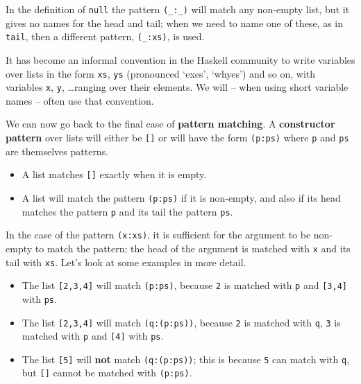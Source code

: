 In the definition
of \texttt{null} the pattern \verb+(_:_)+ will match any non-empty list,
but it gives no names for the head and tail; when we need to name one of
these, as in \texttt{tail}, then a different pattern,
\verb+(_:xs)+,
is used.

It has become an informal convention in the Haskell community to write
variables over lists in the form \texttt{xs}, \texttt{ys}  (pronounced `exes', `whyes')
and so on,
with variables \texttt{x}, \texttt{y}, \ldots ranging over their
elements. We will -- when using short variable names -- often use that convention.

We can now go back to the final case of \textbf{pattern matching}. A \textbf{constructor
pattern} over lists will either be \texttt{[]} or will have the form \texttt{(p:ps)}
where \texttt{p} 
and \texttt{ps} are themselves patterns. 
\begin{itemize}
\item
A list matches \texttt{[]} exactly when it is empty.
\item
A list will match the pattern \texttt{(p:ps)}
if it is non-empty, and also if its head matches the pattern
\texttt{p} and its tail the pattern \texttt{ps}. 
\end{itemize}
In the case of the
pattern \texttt{(x:xs)}, it is sufficient for the argument to be 
non-empty to match the pattern; the head of the argument is matched with \texttt{x} and
its tail with \texttt{xs}. 
Let's look at some examples in more detail.
\begin{itemize}
\item
The list \texttt{[2,3,4]} will match \texttt{(p:ps)}, because \texttt{2} is matched with \texttt{p} and \texttt{[3,4]} with \texttt{ps}.
\item
The list \texttt{[2,3,4]} will match \texttt{(q:(p:ps))}, because \texttt{2} is matched with \texttt{q}, \texttt{3} is matched with \texttt{p} and \texttt{[4]} with \texttt{ps}.
\item
The list \texttt{[5]} will \textbf{not} match \texttt{(q:(p:ps))}; this is because \texttt{5} can match with \texttt{q}, but \texttt{[]} cannot be matched with \texttt{(p:ps)}.
\end{itemize}

\begin{figure}[t]
\end{figure}

